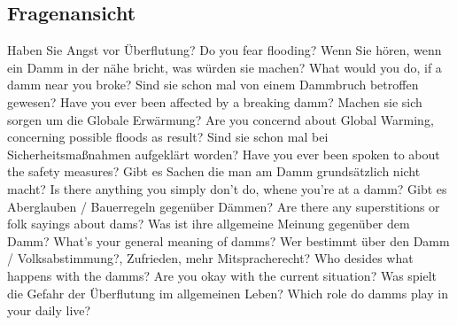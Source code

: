 \subsection{Fragenansicht}
Haben Sie Angst vor Überflutung? \newline
Do you fear flooding?\newline
\newline
Wenn Sie hören, wenn ein Damm in der nähe bricht, was würden sie machen?\newline
What would you do, if a damm near you broke?\newline
\newline
Sind sie schon mal von einem Dammbruch betroffen gewesen?\newline
Have you ever been affected by a breaking damm?\newline
\newline
Machen sie sich sorgen um die Globale Erwärmung?\newline
Are you concernd about Global Warming, concerning possible floods as result?\newline
\newline
Sind sie schon mal bei Sicherheitsmaßnahmen aufgeklärt worden?\newline
Have you ever been spoken to about the safety measures? \newline
\newline
Gibt es Sachen die man am Damm grundsätzlich nicht macht?\newline
Is there anything you simply don't do, whene you're at a damm?\newline
\newline
Gibt es Aberglauben / Bauerregeln gegenüber Dämmen?\newline
Are there any superstitions or folk sayings about dams?\newline
\newline
Was ist ihre allgemeine Meinung gegenüber dem Damm?\newline
What's your general meaning of damms?\newline
\newline
Wer bestimmt über den Damm / Volksabstimmung?, Zufrieden, mehr Mitspracherecht?\newline
Who desides what happens with the damms?\newline
Are you okay with the current situation?\newline
\newline
Was spielt die Gefahr der Überflutung im allgemeinen Leben?\newline
Which role do damms play in your daily live?\newline

